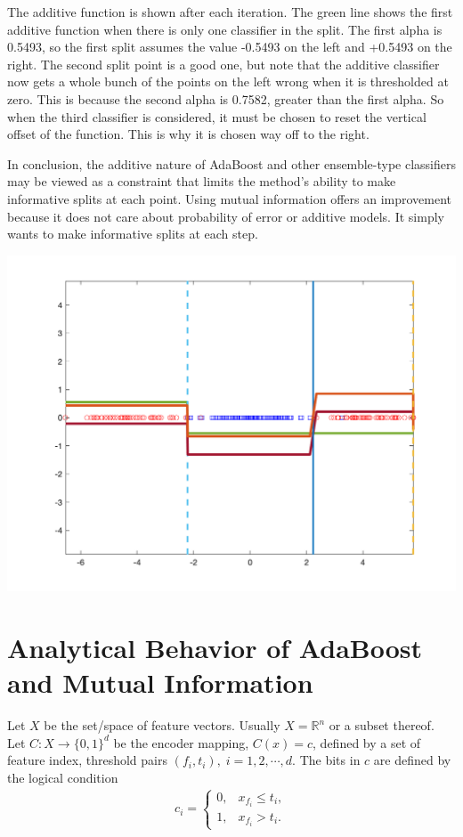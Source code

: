 \documentclass{article}
\begin{document}
The additive function is shown after each iteration.  The green line shows the first additive function when there is only one classifier in the split.  The first alpha is 0.5493, so the first split assumes the value -0.5493 on the left and +0.5493 on the right.  The second split point is a good one, but note that the additive classifier now gets a whole bunch of the points on the left wrong when it is thresholded at zero.  This is because the second alpha is 0.7582, greater than the first alpha.  So when the third classifier is considered, it must be chosen to reset the vertical offset of the function.  This is why it is chosen way off to the right.

In conclusion, the additive nature of AdaBoost and other ensemble-type classifiers may be viewed as a constraint that limits the method's ability to make informative splits at each point.  Using mutual information offers an improvement because it does not care about probability of error or additive models.  It simply wants to make informative splits at each step.

\begin{center}
\includegraphics[width=0.8\linewidth]{adaboost_bug.png}
\end{center}

\section{Analytical Behavior of AdaBoost and Mutual Information}

Let $X$ be the set/space of feature vectors.  Usually $X = \mathbb{R}^n$ or a subset thereof.  Let $C: X \rightarrow \{0,1\}^d$ be the encoder mapping, $C(x) = c$, defined by a set of feature index, threshold pairs $(f_i, t_i), \;i=1, 2, \cdots, d$.  The bits in $c$ are defined by the logical condition
\begin{gather*}
c_i = \begin{cases} 0, & x_{f_i} \leq t_i, \\ 1, & x_{f_i} > t_i. \end{cases}
\end{gather*}
\end{document}
